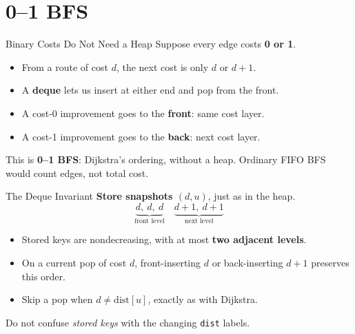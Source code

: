 \documentclass{beamer}
\begin{document}
\section{0--1 BFS}

\begin{frame}{Binary Costs Do Not Need a Heap}
  Suppose every edge costs \textbf{0 or 1}.
  \begin{itemize}
    \item From a route of cost $d$, the next cost is only $d$ or $d+1$.
    \item A \textbf{deque} lets us insert at either end and pop from the front.
    \item A cost-0 improvement goes to the \textbf{front}: same cost layer.
    \item A cost-1 improvement goes to the \textbf{back}: next cost layer.
  \end{itemize}
  \medskip
  This is \textbf{0--1 BFS}: Dijkstra's ordering, without a heap.
  Ordinary FIFO BFS would count edges, not total cost.
\end{frame}

\begin{frame}{The Deque Invariant}
  \textbf{Store snapshots $(d,u)$}, just as in the heap.
  \[
    \underbrace{d,\ d,\ d}_{\text{front level}}
    \quad
    \underbrace{d+1,\ d+1}_{\text{next level}}
  \]
  \begin{itemize}
    \item Stored keys are nondecreasing, with at most \textbf{two adjacent levels}.
    \item On a current pop of cost $d$, front-inserting $d$ or back-inserting $d+1$ preserves this order.
    \item Skip a pop when $d\ne\mathrm{dist}[u]$, exactly as with Dijkstra.
  \end{itemize}
  \medskip
  Do not confuse \emph{stored keys} with the changing \texttt{dist} labels.
\end{frame}
\end{document}
